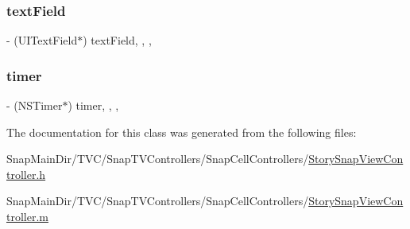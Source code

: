 \subsubsection{\texorpdfstring{text\+Field}{textField}}
{\footnotesize\ttfamily -\/ (U\+I\+Text\+Field$\ast$) text\+Field\hspace{0.3cm}{\ttfamily [read]}, {\ttfamily [write]}, {\ttfamily [nonatomic]}, {\ttfamily [strong]}}

\hypertarget{interface_story_snap_view_controller_a57a20333a472a80cb8c02887b5f8f243}{}\label{interface_story_snap_view_controller_a57a20333a472a80cb8c02887b5f8f243} 
\subsubsection{\texorpdfstring{timer}{timer}}
{\footnotesize\ttfamily -\/ (N\+S\+Timer$\ast$) timer\hspace{0.3cm}{\ttfamily [read]}, {\ttfamily [write]}, {\ttfamily [nonatomic]}, {\ttfamily [strong]}}



The documentation for this class was generated from the following files\+:\begin{DoxyCompactItemize}
\item 
Snap\+Main\+Dir/\+T\+V\+C/\+Snap\+T\+V\+Controllers/\+Snap\+Cell\+Controllers/\hyperlink{_story_snap_view_controller_8h}{Story\+Snap\+View\+Controller.\+h}\item 
Snap\+Main\+Dir/\+T\+V\+C/\+Snap\+T\+V\+Controllers/\+Snap\+Cell\+Controllers/\hyperlink{_story_snap_view_controller_8m}{Story\+Snap\+View\+Controller.\+m}\end{DoxyCompactItemize}
